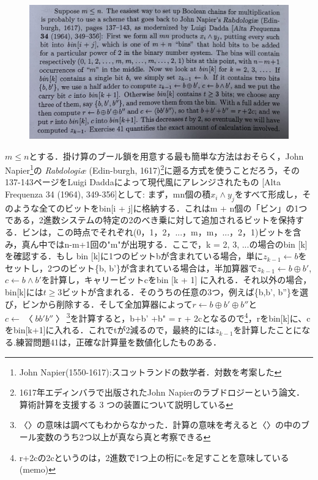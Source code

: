 \documentclass[dvipdfmx,a4paper,12pt]{jsarticle}
\begin{document}
\newpage
\begin{figure}[htbp]
  \centering
  \includegraphics[width=130mm]{images/IMG_73803.jpg}
\end{figure}
$m \leq n$とする．掛け算のブール鎖を用意する最も簡単な方法はおそらく，John Napier\footnote{John Napier(1550-1617):スコットランドの数学者．対数を考案した}の \textit{Rabdologi\ae} (Edin-burgh, 1617)\footnote{1617年エディンバラで出版されたJohn Napierのラブドロジーという論文．算術計算を支援する 3 つの装置について説明している}に遡る方式を使うことだろう，その137-143ページをLuigi Daddaによって現代風にアレンジされたもの [Alta Frequenza 34 (1964), 349-356]として: まず，mn個の積$x_{i} \wedge y_{j}$をすべて形成し，そのような全てのビットをbin[i + j]に格納する．これはm + n個の「ビン」の1つである，2進数システムの特定の2のべき乗に対して追加されるビットを保持する．ビンは，この時点でそれぞれ(0，1，2，...，m，m，...，2，1)ビットを含み，真ん中ではn-m+1回の"m"が出現する．ここで，k = 2, 3, ...の場合のbin [k]を確認する．もし
bin [k]に1つのビットbが含まれている場合，単に$z_{k-1} ← b$をセットし，2つのビット\{b, b'\}が含まれている場合は，半加算器で$z_{k-1}←b \oplus b'$, $c←b\wedge b'$を計算し，キャリービットcをbin [k + 1] に入れる．それ以外の場合，bin[k]には$t\geq 3$ビットが含まれる．そのうちの任意の3つ，例えば\{b,b', b''\}を選び，ビンから削除する．そして全加算器によって$r← b \oplus b' \oplus b''$と$c←〈bb'b''〉$\footnote{〈〉の意味は調べてもわからなかった．計算の意味を考えると〈〉の中のブール変数のうち2つ以上が真なら真と考察できる}を計算すると，b+b' +b" = r + 2cとなるので\footnote{r+2cの2cというのは，2進数で1つ上の桁にcを足すことを意味している(memo)}，rをbin[k]に、cをbin[k+1]に入れる．これでtが2減るので，最終的には$z_{k-1}$を計算したことになる.練習問題41は，正確な計算量を数値化したものある．
\newpage
\end{document}
